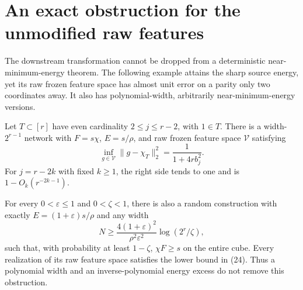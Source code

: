 \section{An exact obstruction for the unmodified raw features}
The downstream transformation cannot be dropped from a deterministic
near-minimum-energy theorem. The following example attains the sharp
source energy, yet its raw frozen feature space has almost unit error
on a parity only two coordinates away. It also has polynomial-width,
arbitrarily near-minimum-energy versions.

\begin{theorem}
Let $T\subset[r]$ have even cardinality $2\le j\le r-2$, with $1\in T$.
There is a width-$2^{r-1}$ network with $F=s\chi$, $E=s/\rho$, and
raw frozen feature space $\mathcal V$ satisfying
\[
 \inf_{g\in\mathcal V}\|g-\chi_T\|_2^2
                  =\frac1{1+4r b_j^2}.                 \tag{24}
\]
For $j=r-2k$ with fixed $k\ge1$, the right side tends to one and is
$1-O_k(r^{-2k-1})$.

For every $0<\varepsilon\le1$ and $0<\zeta<1$, there is also a
random construction with exactly $E=(1+\varepsilon)s/\rho$ and any width
\[
 N\ge\frac{4(1+\varepsilon)^2}{\rho^2\varepsilon^2}
                                  \log(2^r/\zeta),      \tag{25}
\]
such that, with probability at least $1-\zeta$, $\chi F\ge s$ on the
entire cube. Every realization of its raw feature space satisfies the
lower bound in (24). Thus a polynomial width and an inverse-polynomial
energy excess do not remove this obstruction.
\end{theorem}
